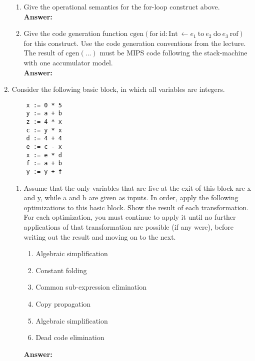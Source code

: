 \documentclass[11pt]{article}
\begin{document}
\begin{enumerate}
   \begin{enumerate}
    \item  Give the operational semantics for the for-loop construct above.\\
    \textbf{Answer:} 
    
   \newpage
    \item  Give the code generation function $\mbox{cgen}(\mbox{for}\ \mbox{id}: \mbox{Int}\ \leftarrow e_1\ \mbox{to}\ e_2\ \mbox{do}\ e_3\ \mbox{rof})$ for this construct. Use the code generation conventions from the lecture. The result of $\mbox{cgen}(...)$ must be MIPS code following the stack-machine with one accumulator model.\\
    \textbf{Answer:} 
    
   \newpage
  \end{enumerate}
  
  
  \item  Consider the following basic block, in which all variables are integers.
  
  \begin{lstlisting}
    x := 0 * 5
    y := a + b
    z := 4 * x
    c := y * x
    d := 4 + 4
    e := c - x
    x := e * d
    f := a + b
    y := y + f
  \end{lstlisting}
  \begin{enumerate}

   \item Assume that the only variables that are live at the exit of this block are x and y, while a and b are given as inputs. In order, apply the following optimizations to this basic block. Show the result of each transformation. For each optimization, you must continue to apply it until no further applications of that transformation are possible (if any were), before writing out the result and moving on to the next.
  
  \begin{enumerate}
    \item Algebraic simplification
    \item Constant folding
    \item Common sub-expression elimination
    \item Copy propagation
    \item Algebraic simplification
    \item Dead code elimination
  \end{enumerate}     
  \textbf{Answer:} 
    

\end{enumerate}
\end{enumerate}
\end{document}
